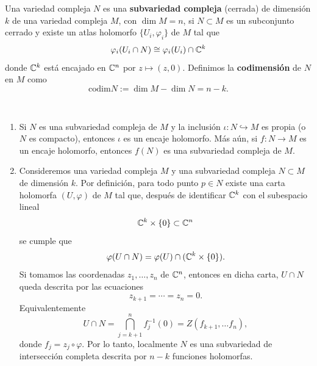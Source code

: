     
    \begin{definition}
        Una variedad compleja $N$ es una \textbf{subvariedad compleja} (cerrada) de dimensión $k$ de una variedad compleja $M$, con $\dim M=n$, si $N\subset M$ es un subconjunto cerrado y existe un atlas holomorfo $\{U_i,\varphi_i\}$ de $M$ tal que 
        \begin{equation*}
            \varphi_i(U_i\cap N)\cong \varphi_i(U_i)\cap\mathbb{C}^k
        \end{equation*}
        donde $\mathbb{C}^k$ está encajado en $\mathbb{C}^n$ por $z\mapsto (z,0)$. Definimos la \textbf{codimensión} de $N$ en $M$ como
        \begin{equation*}
            \mathrm{codim}N:=\dim M-\dim N=n-k.
        \end{equation*}
    \end{definition}
    
    \begin{remark}\label{subvariedadesporecuaciones} $ $
    	\begin{enumerate}
    		\item Si $N$ es una subvariedad compleja de $M$ y la inclusión $\iota:N\hookrightarrow M$ es propia (o $N$ es compacto), entonces $\iota$ es un encaje holomorfo. Más aún, si $f:N\to M$ es un encaje holomorfo, entonces $f(N)$ es una subvariedad compleja de $M$.
    		\item Consideremos una variedad compleja $M$ y una subvariedad compleja $N\subset M$ de dimensión $k$. Por definición, para todo punto $p\in N$ existe una carta holomorfa $(U,\varphi)$ de $M$ tal que, después de identificar $\mathbb{C}^k$ con el subespacio lineal
    		\begin{equation*}
    			\mathbb{C}^k\times\{0\}\subset\mathbb{C}^n
    		\end{equation*}
    		se cumple que
    		\begin{equation*}
    			\varphi(U\cap N)=\varphi(U)\cap (\mathbb{C}^k\times \{0\}).
    		\end{equation*}
    		Si tomamos las coordenadas $z_1,\dots,z_n$ de $\mathbb{C}^n$, entonces en dicha carta, $U\cap N$ queda descrita por las ecuaciones 
    		\begin{equation*}
    			z_{k+1}=\cdots=z_n=0.
    		\end{equation*}
    		Equivalentemente
    		\begin{equation*}
    			U\cap N=\bigcap_{j=k+1}^n f_j^{-1}(0)=Z(f_{k+1},\dots f_n),
    		\end{equation*}
    		donde $f_j=z_j\circ \varphi$. Por lo tanto, localmente $N$ es una subvariedad de intersección completa descrita por $n-k$ funciones holomorfas.
    	\end{enumerate}
    \end{remark}

